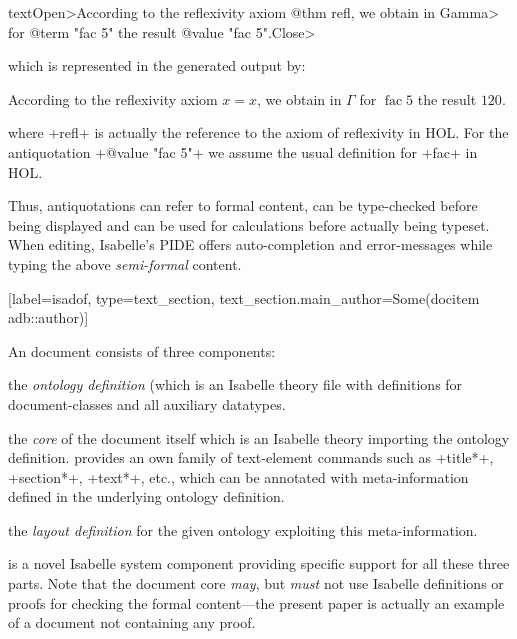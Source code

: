 \begin{isabellebody}
\begin{isamarkuptext}
\begin{isar}
  text\<Open>According to the reflexivity axiom @{thm refl}, we obtain in \<Gamma> 
           for @{term "fac 5"} the result @{value "fac 5"}.\<Close>
\end{isar}
which is represented in the generated output by:
\begin{out}
  According to the reflexivity axiom $x = x$, we obtain in $\Gamma$ for $\operatorname{fac} 5$
  the result $120$.
\end{out}
where \inlineisar+refl+ is actually the reference to the axiom of reflexivity in HOL. 
For the antiquotation \inlineisar+@{value "fac 5"}+  we assume the usual definition for 
\inlineisar+fac+ in HOL.%
\end{isamarkuptext}\isamarkuptrue%
%
\begin{isamarkuptext}%
Thus, antiquotations can refer to formal content, can be type-checked before being 
displayed and can be used for calculations before actually being typeset. When editing, 
Isabelle's PIDE offers auto-completion and error-messages while typing the above 
\emph{semi-formal} content.%
\end{isamarkuptext}\isamarkuptrue%
%
\isaDofSectionTextSection%
%
[label={isadof}, type={text_section},
         text_section.main_author={Some({\isacharat}{docitem adb}::author)}]%
{\isadof}%
%
\begin{isamarkuptext}%
An \isadof document consists of three components: 
\begin{compactitem}
\item the \emph{ontology definition} (which is an Isabelle theory file with definitions
  for document-classes and all auxiliary datatypes.  
\item the \emph{core} of the document itself which is an Isabelle theory
  importing the ontology definition. \isadof provides an own family of text-element
  commands such as \inlineisar+title*+, \inlineisar+section*+,  \inlineisar+text*+, etc., 
  which can be annotated with meta-information defined in the underlying  ontology definition.
\item the  \emph{layout definition} for the given ontology exploiting this meta-information.
\end{compactitem}
\isadof is a novel Isabelle system component providing specific support for all these three parts.
Note that the document core \emph{may}, but \emph{must} not 
use Isabelle definitions or proofs for checking the formal content---the 
present paper is actually an example of a document not containing any proof.


\end{isamarkuptext}
\end{isabellebody}
